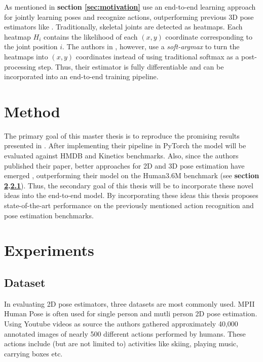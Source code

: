 \documentclass[twoside]{article}
\begin{document}
\begin{multicols}{2}
As mentioned in \textbf{section \ref{sec:motivation}} \cite{luvizon_2d/3d_2018} use an end-to-end learning approach for jointly learning poses and recognize actions, outperforming previous 3D pose estimators like \cite{martinez_simple_2017}.
Traditionally, skeletal joints are detected as heatmaps.
Each heatmap $H_i$ contains the likelihood of each $(x,y)$ coordinate corresponding to the joint position $i$.
The authors in \cite{luvizon_2d/3d_2018}, however, use a \textit{soft-argmax}\cite{luvizon_human_2017} to turn the heatmaps into $(x,y)$ coordinates instead of using traditional softmax as a post-processing step.
Thus, their estimator is fully differentiable and can be incorporated into an end-to-end training pipeline.

\section{Method}

The primary goal of this master thesis is to reproduce the promising results presented in \cite{luvizon_2d/3d_2018}.
After implementing their pipeline in PyTorch \cite{paszke_automatic_2017} the model will be evaluated against HMDB \cite{kuehne_hmdb:_2011} and Kinetics \cite{kay_kinetics_2017} benchmarks.
Also, since the authors published their paper, better approaches for 2D and 3D pose estimation have emerged \cite{pavllo_3d_2019}, outperforming their model on the Human3.6M benchmark (see \textbf{section \ref{sec:experiment}.\ref{sec:dataset}}).
Thus, the secondary goal of this thesis will be to incorporate these novel ideas into the end-to-end model.
By incorporating these ideas this thesis proposes state-of-the-art performance on the previously mentioned action recognition and pose estimation benchmarks.

\section{Experiments}
\label{sec:experiment}
\subsection{Dataset}
\label{sec:dataset}

In evaluating 2D pose estimators, three datasets are most commonly used.
MPII Human Pose \cite{andriluka_2d_2014} is often used for single person and mutli person 2D pose estimation.
Using Youtube videos as source the authors gathered approximately 40,000 annotated images of nearly 500 different actions performed by humans.
These actions include (but are not limited to) activities like skiing, playing music, carrying boxes etc.


\end{multicols}
\end{document}
